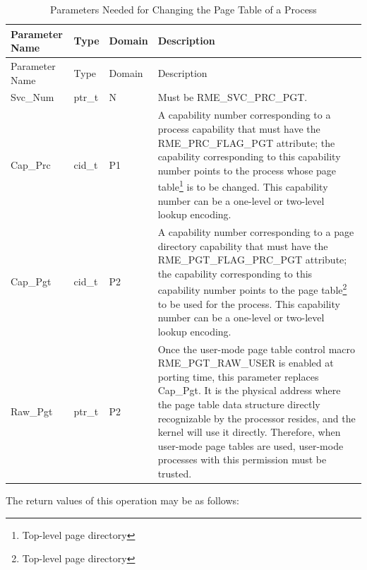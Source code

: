 \begin{xltabular}{\textwidth}{@{}>{\hsize\raggedright\arraybackslash}X>{\hsize\raggedright\arraybackslash}X>{\hsize\raggedright\arraybackslash}X>{\hsize\raggedright\arraybackslash}X@{}}
\caption{Parameters Needed for Changing the Page Table of a Process}\label{tab:4-16-change-process-page-table-parameters}\\
\toprule
Parameter Name & Type & Domain & Description\tabularnewline
\endfirsthead
\toprule
Parameter Name & Type & Domain & Description\tabularnewline
\midrule
\endhead
\bottomrule
\endlastfoot
Svc\_Num & ptr\_t & N & Must be RME\_SVC\_PRC\_PGT.\tabularnewline
Cap\_Prc & cid\_t & P1 &
A capability number corresponding to a process capability that must have the RME\_PRC\_FLAG\_PGT attribute; the capability corresponding to this capability number points to the process whose page table\footnote{Top-level page directory} is to be changed. This capability number can be a one-level or two-level lookup encoding.\tabularnewline
Cap\_Pgt & cid\_t & P2 &
A capability number corresponding to a page directory capability that must have the RME\_PGT\_FLAG\_PRC\_PGT attribute; the capability corresponding to this capability number points to the page table\footnote{Top-level page directory} to be used for the process. This capability number can be a one-level or two-level lookup encoding.\tabularnewline
Raw\_Pgt & ptr\_t & P2 &
Once the user-mode page table control macro RME\_PGT\_RAW\_USER is enabled at porting time, this parameter replaces Cap\_Pgt. It is the physical address where the page table data structure directly recognizable by the processor resides, and the kernel will use it directly. Therefore, when user-mode page tables are used, user-mode processes with this permission must be trusted.\tabularnewline
\end{xltabular}
\nopagebreak[4]

The return values of this operation may be as follows:

